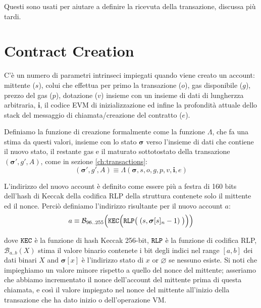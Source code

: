 \documentclass[9pt,oneside]{amsart}
\begin{document}
\begin{multicols}{2}
Questi sono usati per aiutare a definire la ricevuta della transazione, discussa più tardi.


\section{Contract Creation} \label{ch:create}

C'è un numero di parametri intrinseci impiegati quando viene creato un account: mittente ($s$), colui che effettua per primo la transazione ($o$), gas disponibile ($g$), prezzo del gas ($p$), dotazione ($v$) insieme con un insieme di dati di lungherzza arbitraria, $\mathbf{i}$, il codice EVM di inizializzazione ed infine la profondità attuale dello stack del messaggio di chiamata/creazione del contratto ($e$).

Definiamo la funzione di creazione formalmente come la funzione $\Lambda$, che fa una stima da questi valori, insieme con lo stato $\boldsymbol{\sigma}$ verso l'insieme di dati che contiene il nuovo stato, il restante gas e il maturato sottotostato della transazione $(\boldsymbol{\sigma}', g', A)$, come in sezione \ref{ch:transactions}:
\begin{equation}
(\boldsymbol{\sigma}', g', A) \equiv \Lambda(\boldsymbol{\sigma}, s, o, g, p, v, \mathbf{i}, e)
\end{equation}

L'indirizzo del nuovo account è definito come essere più a festra di 160 bits dell'hash di Keccak della codifica RLP della struttura contenete solo il mittente ed il nonce. Perciò definiamo l'indirizzo risultante per il nuovo account $a$:
\begin{equation}
a \equiv \mathcal{B}_{96..255}\Big(\mathtt{\tiny KEC}\Big(\mathtt{\tiny RLP}\big(\;(s, \boldsymbol{\sigma}[s]_n - 1)\;\big)\Big)\Big)
\end{equation}

dove $\mathtt{\tiny KEC}$ è la funzione di hash Keccak 256-bit, $\mathtt{\tiny RLP}$ è la funzione di codifica RLP, $\mathcal{B}_{a..b}(X)$ stima il valore binario contenete i bit degli indici nel range $[a, b]$ dei dati binari $X$ and $\boldsymbol{\sigma}[x]$ è l'indirizzo stato di $x$ or $\varnothing$ se nessuno esiste. Si noti che impieghiamo un valore minore rispetto a quello del nonce del mittente; asseriamo che abbiamo incrementato il nonce dell'account del mittente prima di questa chiamata, e così il valore impiegato nel nonce del mittente all'inizio della transazione che ha dato inizio o dell'operazione VM.


\end{multicols}
\end{document}
